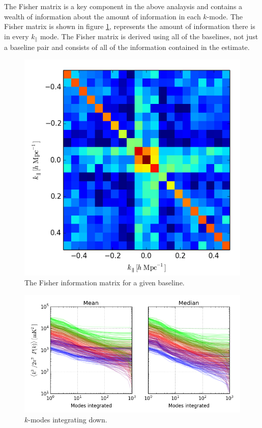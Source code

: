 \documentclass[twocolumn,numberedappendix]{emulateapj} \shorttitle{PSA64}
\begin{document}
The Fisher matrix is a key component in the above analaysis and contains a
wealth of information about the amount of information in each $k$-mode. The
Fisher matrix is shown in figure \ref{fig:fisher}, represents the amount of
information there is in every $k_{\parallel}$ mode. The Fisher matrix is derived
using all of the baselines, not just a baseline pair and consists of all of the
information contained in the estimate.

\begin{figure}[b!]\centering
\includegraphics[width=\columnwidth, height=\columnwidth]{plots/fisher.png}
\caption{The Fisher information matrix for a given baseline.}
\label{fig:fisher}
\end{figure}


\begin{figure}[t!]\centering
\includegraphics[width=1.8\columnwidth]{plots/pspec_variance.png}
\caption{$k$-modes integrating down.}
\label{fig:pspec_variance}
\end{figure}
\end{document}
